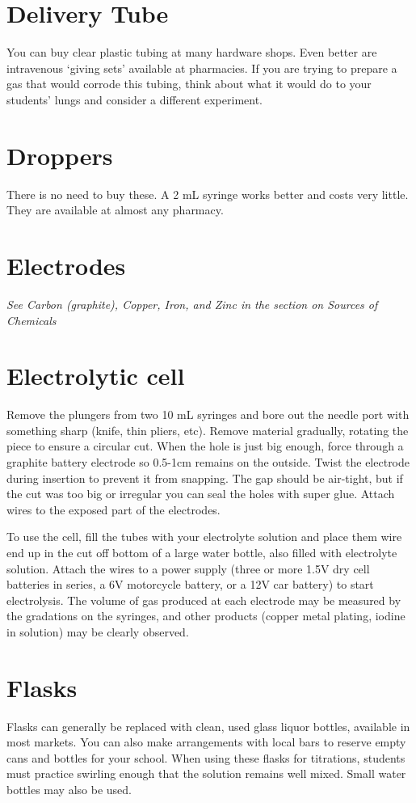 \section{Delivery Tube}
You can buy clear plastic tubing at many hardware shops. 
Even better are intravenous ‘giving sets’ available at pharmacies. 
If you are trying to prepare a gas that would corrode this tubing, 
think about what it would do to your students' lungs 
and consider a different experiment.

\section{Droppers}
There is no need to buy these. 
A 2 mL syringe works better and costs very little. 
They are available at almost any pharmacy.

\section{Electrodes}
\textit{See Carbon (graphite), 
Copper, 
Iron, 
and Zinc in the section on Sources of Chemicals}

\section{Electrolytic cell}
Remove the plungers from two 10 mL syringes 
and bore out the needle port with something sharp (knife, 
thin pliers, 
etc). 
Remove material gradually, 
rotating the piece to ensure a circular cut. 
When the hole is just big enough, 
force through a graphite battery electrode 
so 0.5-1cm remains on the outside. 
Twist the electrode during insertion to prevent it from snapping. 
The gap should be air-tight, 
but if the cut was too big or irregular 
you can seal the holes with super glue. 
Attach wires to the exposed part of the electrodes.

To use the cell, 
fill the tubes with your electrolyte solution 
and place them wire end up in the cut off bottom of a large water bottle, 
also filled with electrolyte solution. 
Attach the wires to a power supply 
(three or more 1.5V dry cell batteries in series, 
a 6V motorcycle battery, 
or a 12V car battery) to start electrolysis. 
The volume of gas produced at each electrode 
may be measured by the gradations on the syringes, 
and other products (copper metal plating, 
iodine in solution) may be clearly observed.

\section{Flasks}
Flasks can generally be replaced with clean, 
used glass liquor bottles, 
available in most markets. 
You can also make arrangements with local bars 
to reserve empty cans and bottles for your school. 
When using these flasks for titrations, 
students must practice swirling enough that the solution remains well mixed. 
Small water bottles may also be used.

